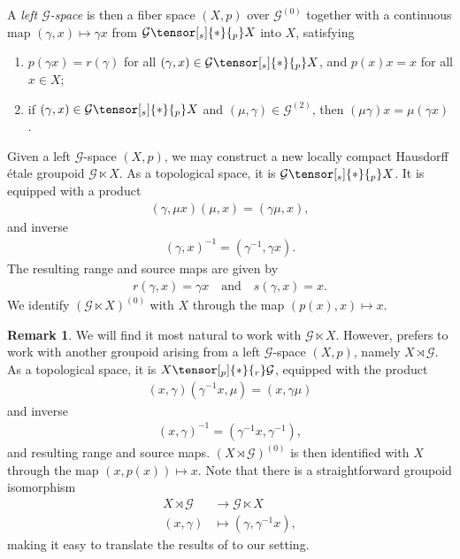 \documentclass[11pt,a4paper,oneside,final,reqno]{amsart}
\theoremstyle{definition}
\newtheorem{remark}[lemma]{Remark}
\newcommand{\G}{\mathcal{G}}
\newcommand{\Go}{\mathcal{G}^{(0)}}
\numberwithin{equation}{section}
\begin{document}
	
	
	A \emph{left $\G$-space} is then a fiber space $(X, p)$ over $\Go$ together with a continuous map $(\gamma, x) \mapsto \gamma x$ from $\G \tensor[_s]{*}{_p}  X$ into $X$, satisfying
	\begin{enumerate}
		\item $p(\gamma x) = r(\gamma)$ for all $(\gamma, x) \in \G \tensor[_s]{*}{_p} X$, and $p(x)x = x$ for all $x \in X$;
		\item if $(\gamma, x) \in \G \tensor[_s]{*}{_p} X$ and $(\mu, \gamma)\in \G^{(2)}$, then $(\mu\gamma)x = \mu(\gamma x)$.
	\end{enumerate}
 
		Given a left $\G$-space $(X,p)$, we may construct a new locally compact Hausdorff \'etale groupoid $\G \ltimes X$. As a topological space, it is $\G \tensor[_s]{*}{_p} X$. It is equipped with a product
		\begin{align*}
			(\gamma, \mu  x) (\mu, x) = (\gamma \mu, x),
		\end{align*}
		and inverse
		\begin{align*}
			(\gamma,x)^{-1} = (\gamma^{-1}, \gamma  x).
		\end{align*}
		The resulting range and source maps are given by
		\begin{align*}
			r(\gamma, x) = \gamma  x \quad \text{and} \quad s(\gamma,x) = x.
		\end{align*}
		We identify $(\G \ltimes X)^{(0)}$ with $X$ through the map $(p(x), x) \mapsto x$.
		\begin{remark}\label{remark:left-right-groupoid-isomorphism}
			We will  find it most natural to work with $\G \ltimes X$. However, 
			\cite{DelarocheExactGroupoidsV3} prefers to work with another groupoid arising from a left $\G$-space $(X,p)$, namely $X \rtimes \G$. As a topological space, it is $X \tensor[_p]{*}{_r}\G$, equipped with the product
				\begin{align*}
						(x, \gamma)(\gamma^{-1}x, \mu) = (x, \gamma \mu)
					\end{align*}
				and inverse
				\begin{align*}
						(x, \gamma)^{-1} = (\gamma^{-1}x, \gamma^{-1}),
					\end{align*}
			and resulting range and source maps. $(X \rtimes \G)^{(0)}$ is then identified with $X$ through the map $(x, p(x)) \mapsto x$.  
			Note that there is  a straightforward groupoid isomorphism
			\begin{align*}
				X \rtimes \G &\to \G \ltimes X \\
				(x,\gamma) &\mapsto (\gamma, \gamma^{-1}x),
			\end{align*}
		 	making it easy to translate the results of  \cite{DelarocheExactGroupoidsV3} to our setting.
			 
		\end{remark}
	
\end{document}
